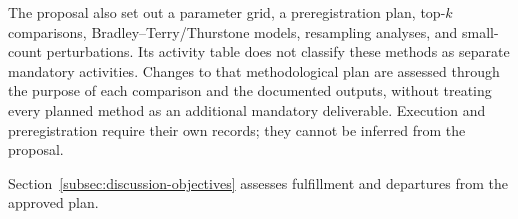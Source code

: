 \documentclass{article}
\theoremstyle{plain}
\theoremstyle{remark}
\begin{document}
The proposal also set out a parameter grid, a preregistration plan, top-$k$ comparisons, Bradley--Terry/Thurstone models, resampling analyses, and small-count perturbations. Its activity table does not classify these methods as separate mandatory activities. Changes to that methodological plan are assessed through the purpose of each comparison and the documented outputs, without treating every planned method as an additional mandatory deliverable. Execution and preregistration require their own records; they cannot be inferred from the proposal.

Section~\ref{subsec:discussion-objectives} assesses fulfillment and departures from the approved plan.


\end{document}
